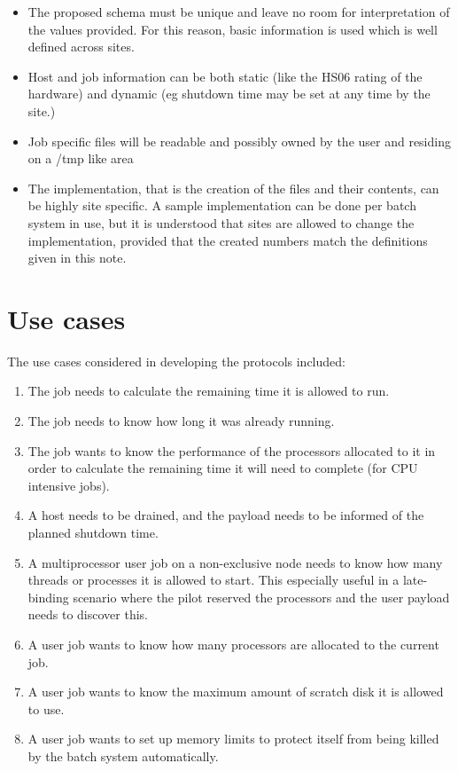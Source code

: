 \documentclass[12pt,a4paper]{article}
\begin{document}
\begin{itemize}
\item The proposed schema must be unique and leave no room for interpretation of the values provided.
      For this reason, basic information is used which is well defined across sites.
\item Host and job information can be both static (like the HS06\cite{HEPIXHS06} rating of the 
      hardware) and dynamic (eg shutdown time may be set at any time by the site.)
\item Job specific files will be readable and possibly owned by the user and
      residing on a /tmp like area
\item The implementation, that is the creation of the files and their contents, can
      be highly site specific. A sample implementation can be done per batch
      system in use, but it is understood that sites are allowed to change the
      implementation, provided that the created numbers match the definitions
      given in this note.
\end{itemize}

\section{Use cases}
\label{sec:Use cases}

The use cases considered in developing the protocols included:

\begin{enumerate}
\item The job needs to calculate the remaining time it is allowed to run.
\item The job needs to know how long it was already running.
\item The job wants to know the performance of the processors allocated to it in order to calculate the remaining time it will need to complete (for CPU intensive jobs).
\item A host needs to be drained, and the payload needs to be informed of the planned shutdown time.
\item A multiprocessor user job on a non-exclusive node needs to know how many threads or processes it is allowed to start. This
      especially useful in a late-binding scenario where the pilot reserved the processors and the user payload needs to discover this.
\item A user job wants to know how many processors are allocated to the current job.
\item A user job wants to know the maximum amount of scratch disk it is allowed to use.
\item A user job wants to set up memory limits to protect itself from being killed by the batch system automatically.
\end{enumerate}
\end{document}
